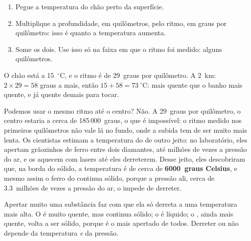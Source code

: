 \begin{method}\label{met:g6:inside-the-earth:temperature}
\begin{enumerate}
  \item Pegue a temperatura do chão perto da superfície.
  \item Multiplique a profundidade, em quilômetros, pelo ritmo, em graus
        por quilômetro: isso é quanto a temperatura aumenta.
  \item Some os dois. Use isso só na faixa em que o ritmo foi medido:
        alguns quilômetros.
\end{enumerate}
\end{method}

\begin{example}\label{ex:g6:inside-the-earth:two-km}
O chão está a 15~$^\circ$C, e o ritmo é de 29~graus por quilômetro. A
2~km: $2 \times 29 = 58$ graus a mais, então $15 + 58 = 73~^\circ$C: mais
quente que o banho mais quente, e já quente demais para tocar.
\end{example}

Podemos usar o mesmo ritmo até o centro? Não. A 29~graus por quilômetro,
o centro estaria a cerca de 185\,000~graus, o que é impossível: o ritmo
medido nos primeiros quilômetros não vale lá no fundo, onde a subida tem de ser muito mais lenta. Os cientistas estimam a temperatura
do  de outro jeito: no laboratório, eles apertam grãozinhos de ferro
entre dois diamantes, até milhões de vezes a pressão do ar, e os aquecem
com lasers até eles derreterem. Desse jeito, eles descobriram que, na borda
do  sólido, a temperatura é de cerca de
\textbf{6000~graus Celsius}, e mesmo assim o ferro do  continua sólido, porque a pressão ali, cerca de
3.3~milhões de vezes a pressão do ar, o impede de derreter.

\begin{remark}\label{rem:g6:inside-the-earth:pressure}
Apertar muito uma substância faz com que ela só derreta a uma temperatura
mais alta. O  é muito quente, mas continua sólido; o  é
líquido; o , ainda mais quente, volta a ser sólido, porque é
o mais apertado de todos. Derreter ou não depende da temperatura \emph{e}
da pressão.
\end{remark}

